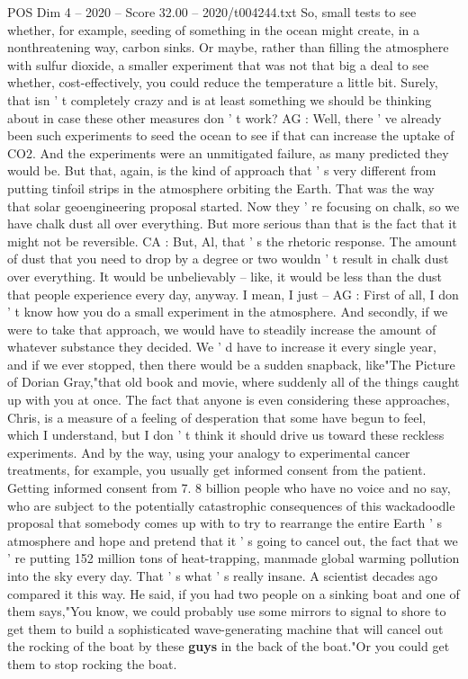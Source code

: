\begin{textsample}{POS Dim 4 – 2020 – Score 32.00 – 2020/t004244.txt}
So, small tests to see whether, for example, seeding of something in the ocean might create, in a nonthreatening way, carbon sinks.
Or maybe, rather than filling the atmosphere with sulfur dioxide, a smaller experiment that was not that big a deal to see whether, cost-effectively, you could reduce the temperature a little bit.
Surely, that isn ' t completely crazy and is at least something we should be thinking about in case these other measures don ' t work?
AG : Well, there ' ve already been such experiments to seed the ocean to see if that can increase the uptake of CO2.
And the experiments were an unmitigated failure, as many predicted they would be.
But that, again, is the kind of approach that ' s very different from putting tinfoil strips in the atmosphere orbiting the Earth.
That was the way that solar geoengineering proposal started.
Now they ' re focusing on chalk, so we have chalk dust all over everything.
But more serious than that is the fact that it might not be reversible.
CA : But, Al, that ' s the rhetoric response.
The amount of dust that you need to drop by a degree or two wouldn ' t result in chalk dust over everything.
It would be unbelievably -- like, it would be less than the dust that people experience every day, anyway.
I mean, I just -- AG : First of all, I don ' t know how you do a small experiment in the atmosphere.
And secondly, if we were to take that approach, we would have to steadily increase the amount of whatever substance they decided.
We ' d have to increase it every single year, and if we ever stopped, then there would be a sudden snapback, like"The Picture of Dorian Gray,"that old book and movie, where suddenly all of the things caught up with you at once.
The fact that anyone is even considering these approaches, Chris, is a measure of a feeling of desperation that some have begun to feel, which I understand, but I don ' t think it should drive us toward these reckless experiments.
And by the way, using your analogy to experimental cancer treatments, for example, you usually get informed consent from the patient.
Getting informed consent from 7. 8 billion people who have no voice and no say, who are subject to the potentially catastrophic consequences of this wackadoodle proposal that somebody comes up with to try to rearrange the entire Earth ' s atmosphere and hope and pretend that it ' s going to cancel out, the fact that we ' re putting 152 million tons of heat-trapping, manmade global warming pollution into the sky every day.
That ' s what ' s really insane.
A scientist decades ago compared it this way.
He said, if you had two people on a sinking boat and one of them says,"You know, we could probably use some mirrors to signal to shore to get them to build a sophisticated wave-generating machine that will cancel out the rocking of the boat by these \textbf{guys} in the back of the boat."Or you could get them to stop rocking the boat.

\end{textsample}
